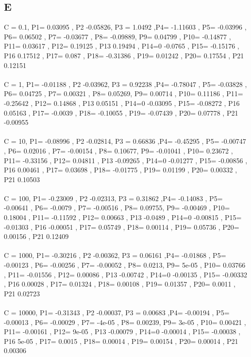 \documentclass[11pt]{article} %
\begin{document}
 \subsection{E}
C = 0.1, P1= 0.03095 , P2 -0.05826, P3 = 1.0492 ,P4= -1.11603 , P5= -0.03996 , P6= 0.06502 , P7= -0.03677 , P8= -0.09889, P9= 0.04799 , P10= -0.14877 , P11= 0.03617 , P12= 0.19125 , P13 0.19494 , P14=0 -0.0765 , P15= -0.15176 , P16 0.17512 , P17= 0.087 , P18= -0.31386 , P19= 0.01242 , P20= 0.17554 , P21 0.12151\\\\ 
 C = 1, P1= -0.01188 , P2 -0.03962, P3 = 0.92238 ,P4= -0.78047 , P5= -0.03828 , P6= 0.04725 , P7= 0.00321 , P8= 0.05269, P9= 0.00714 , P10= 0.11186 , P11= -0.25642 , P12= 0.14868 , P13 0.05151 , P14=0 -0.03095 , P15= -0.08272 , P16 0.05163 , P17= -0.0039 , P18= -0.10055 , P19= -0.07439 , P20= 0.07778 , P21 -0.00955\\\\ 
 C = 10, P1= -0.08996 , P2 -0.02814, P3 = 0.66836 ,P4= -0.45295 , P5= -0.00747 , P6= 0.02016 , P7= -0.00154 , P8= 0.10677, P9= -0.01041 , P10= 0.23672 , P11= -0.33156 , P12= 0.04811 , P13 -0.09265 , P14=0 -0.01277 , P15= -0.00856 , P16 0.00461 , P17= 0.03698 , P18= -0.01775 , P19= 0.01199 , P20= 0.00332 , P21 0.10503\\\\ 
 C = 100, P1= -0.23009 , P2 -0.02313, P3 = 0.31862 ,P4= -0.14083 , P5= -0.00641 , P6= -0.0079 , P7= -0.00516 , P8= 0.09755, P9= -0.00469 , P10= 0.18004 , P11= -0.11592 , P12= 0.00663 , P13 -0.0489 , P14=0 -0.00815 , P15= -0.01303 , P16 -0.00051 , P17= 0.05749 , P18= 0.00114 , P19= 0.05736 , P20= 0.00156 , P21 0.12409 \\\\
 C = 1000, P1= -0.30216 , P2 -0.00362, P3 = 0.06161 ,P4= -0.01868 , P5= -0.00123 , P6= -0.00256 , P7= -0.00052 , P8= 0.0213, P9= 5e-05 , P10= 0.03766 , P11= -0.01556 , P12= 0.00086 , P13 -0.00742 , P14=0 -0.00135 , P15= -0.00332 , P16 0.00028 , P17= 0.01324 , P18= 0.00108 , P19= 0.01357 , P20= 0.0011 , P21 0.02723\\\\ 
 C = 10000, P1= -0.31343 , P2 -0.00037, P3 = 0.00683 ,P4= -0.00194 , P5= -0.00013 , P6= -0.00029 , P7= -4e-05 , P8= 0.00239, P9= 3e-05 , P10= 0.00421 , P11= -0.00161 , P12= 9e-05 , P13 -0.00079 , P14=0 -0.00014 , P15= -0.00038 , P16 5e-05 , P17= 0.0015 , P18= 0.00014 , P19= 0.00154 , P20= 0.00014 , P21 0.00306\\\\ 
\end{document}
